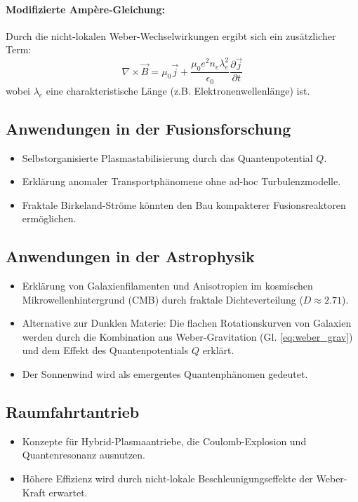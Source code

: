 \documentclass[11pt, a4paper]{article}
\begin{document}
\paragraph{Modifizierte Ampère-Gleichung:}
Durch die nicht-lokalen Weber-Wechselwirkungen ergibt sich ein zusätzlicher Term:
\begin{equation}
\label{eq:ampere_mod}
\nabla \times \vec{B} = \mu_0 \vec{j} + \frac{\mu_0 e^2 n_e \lambda_e^2}{\epsilon_0} \frac{\partial \vec{j}}{\partial t}
\end{equation}
wobei $\lambda_e$ eine charakteristische Länge (z.B. Elektronenwellenlänge) ist.

\subsection{Anwendungen in der Fusionsforschung}
\label{subsec:fusion}
\begin{itemize}
    \item Selbstorganisierte Plasmastabilisierung durch das Quantenpotential $Q$.
    \item Erklärung anomaler Transportphänomene ohne ad-hoc Turbulenzmodelle.
    \item Fraktale Birkeland-Ströme könnten den Bau kompakterer Fusionsreaktoren ermöglichen.
\end{itemize}

\subsection{Anwendungen in der Astrophysik}
\label{subsec:astro}
\begin{itemize}
    \item Erklärung von Galaxienfilamenten und Anisotropien im kosmischen Mikrowellenhintergrund (CMB) durch fraktale Dichteverteilung ($D \approx 2.71$).
    \item Alternative zur Dunklen Materie: Die flachen Rotationskurven von Galaxien werden durch die Kombination aus Weber-Gravitation (Gl. \ref{eq:weber_grav}) und dem Effekt des Quantenpotentials $Q$ erklärt.
    \item Der Sonnenwind wird als emergentes Quantenphänomen gedeutet.
\end{itemize}

\subsection{Raumfahrtantrieb}
\label{subsec:antrieb}
\begin{itemize}
    \item Konzepte für Hybrid-Plasmaantriebe, die Coulomb-Explosion und Quantenresonanz ausnutzen.
    \item Höhere Effizienz wird durch nicht-lokale Beschleunigungseffekte der Weber-Kraft erwartet.
\end{itemize}
\end{document}
